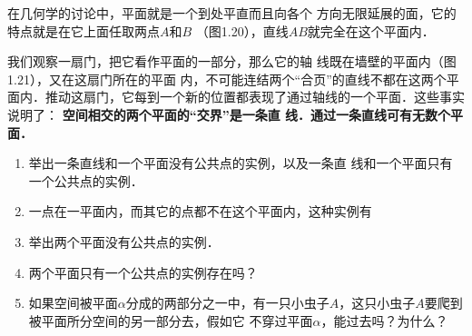 在几何学的讨论中，平面就是一个到处平直而且向各个
方向无限延展的面，它的特点就是在它上面任取两点$A$和$B$
（图1.20），直线$AB$就完全在这个平面内．

\begin{figure}[htp]\centering
    \begin{minipage}[t]{0.48\textwidth}
    \centering
{}
    \caption{}
    \end{minipage}
    \begin{minipage}[t]{0.48\textwidth}
    \centering
    \caption{}
    \end{minipage}
    \end{figure}

我们观察一扇门，把它看作平面的一部分，那么它的轴
线既在墙壁的平面内（图1.21），又在这扇门所在的平面
内，不可能连结两个“合页”的直线不都在这两个平面内．推动这扇门，它每到一个新的位置都表现了通过轴线的一个平面．这些事实说明了：
\textbf{空间相交的两个平面的“交界”是一条直
线．通过一条直线可有无数个平面．}

\begin{ex}
\begin{enumerate}
	\item 举出一条直线和一个平面没有公共点的实例，以及一条直
	线和一个平面只有一个公共点的实例．
	\item 一点在一平面内，而其它的点都不在这个平面内，这种实例有\item 举出两个平面没有公共点的实例．
	\item 两个平面只有一个公共点的实例存在吗？
	\item 如果空间被平面$\alpha$分成的两部分之一中，有一只小虫子$A$，这只小虫子$A$要爬到	被平面所分空间的另一部分去，假如它
	不穿过平面$\alpha$，能过去吗？为什么？
\begin{center}
	\begin{tikzpicture}
		
	\end{tikzpicture}
\end{center}
\end{enumerate}
\end{ex}

